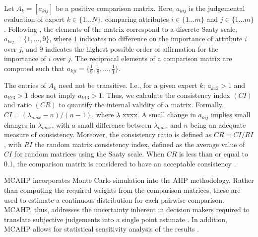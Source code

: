 \documentclass[a4paper]{article}
\begin{document}
Let $A_k=[a_{kij}]$ be a positive comparison matrix.
Here, $a_{kij}$ is the judgemental evaluation of expert $k \in \lbrace 1 \dots N \rbrace$, comparing attributes $i  \in \lbrace 1 \dots m \rbrace $ and $j  \in \lbrace 1 \dots m \rbrace$.
Following \citet{Saaty:1987}, the elements of the matrix correspond to a discrete Saaty scale; $a_{kij}=\lbrace 1,\dots,9\rbrace$, where $1$ indicates no difference on the importance of attribute $i$ over $j$, and $9$ indicates the highest possible order of affirmation for the importance of $i$ over $j$.
The reciprocal elements of a comparison matrix are computed such that $a_{kji}=\lbrace \frac{1}{9},\frac{1}{8},\dots,\frac{1}{1} \rbrace$.

The entries of $A_k$ need not be transitive. 
I.e., for a given expert $k$; $a_{k12}>1$ and $a_{k23}>1$ does not imply $a_{k13}>1$.
Thus, we calculate the consistency index $(CI)$ and ratio $(CR)$ to quantify the internal validity of a matrix.
Formally, $CI=(\lambda_{max}-n)/(n-1)$, where $\lambda$ xxxx. 
A small change in $a_{kij}$ implies small changes in $\lambda_{max}$, with a small difference between $\lambda_{max}$ and $n$ being an adequate measure of consistency. 
Moreover, the consistency ratio is defined as $CR=CI/RI$, with $RI$ the random matrix consistency index, defined as the average value of $CI$ for random matrices using the Saaty scale. 
When $CR$ is less than or equal to 0.1, the comparison matrix is considered to have an acceptable consistency \citep{Ishizaka:2011, Saaty:1987}.

MCAHP incorporates Monte Carlo simulation into the AHP methodology.
Rather than computing the required weights from the comparison matrices, these are used to estimate a continuous distribution for each pairwise comparison.
MCAHP, thus, addresses the uncertainty inherent in decision makers required to translate 
subjective judgements into a single point estimate \citep{Ataei:2013}.
In addition, MCAHP allows for statistical sensitivity analysis of the results \citep{Banuelas:2004, Vaidya:2006}. 
\end{document}
